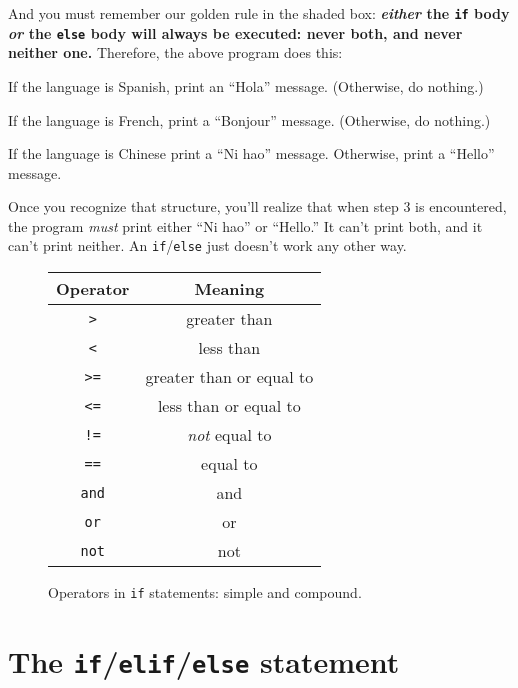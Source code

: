 
And you must remember our golden rule in the shaded box:
\textbf{\textit{either} the \texttt{if} body \textit{or} the \texttt{else} body
will always be executed: never both, and never neither one.} Therefore, the
above program does this:

\begin{samepage}
\begin{compactenum}
\item If the language is Spanish, print an ``Hola'' message. (Otherwise, do
nothing.)
\item If the language is French, print a ``Bonjour'' message. (Otherwise, do
nothing.)
\item If the language is Chinese print a ``Ni hao'' message. Otherwise, print a
``Hello'' message.
\end{compactenum}
\end{samepage}

Once you recognize that structure, you'll realize that when step 3 is
encountered, the program \textit{must} print either ``Ni hao'' or ``Hello.'' It
can't print both, and it can't print neither. An \texttt{if}/\texttt{else} just
doesn't work any other way.

\begin{figure}[tb]
\centering
\small
\bigskip
\begin{tabular}{c|c}
Operator & Meaning \\
\hline
\texttt{>} & greater than \\
\hline
\texttt{<} & less than \\
\hline
\texttt{>=} & greater than or equal to \\
\hline
\texttt{<=} & less than or equal to \\
\hline
\texttt{!=} & \textit{not} equal to \\
\hline
\texttt{==} & equal to \\
\hline
\texttt{and} & and \\
\hline
\texttt{or} & or \\
\hline
\texttt{not} & not \\
\end{tabular}

\bigskip
\normalsize
\caption{Operators in \texttt{if} statements: simple and compound.}
\label{fig:ifStatementOps}
\end{figure}

\section{The \texttt{if}/\texttt{elif}/\texttt{else} statement}

